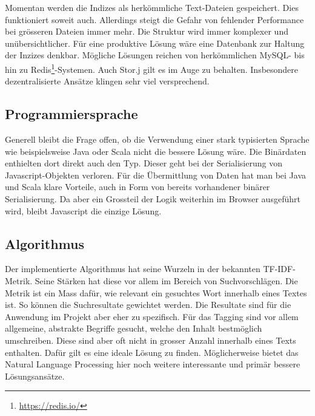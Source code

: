Momentan werden die Indizes als herkömmliche Text-Dateien gespeichert. Dies funktioniert soweit auch. Allerdings steigt die Gefahr von fehlender Performance bei grösseren Dateien immer mehr. Die Struktur wird immer komplexer und unübersichtlicher. Für eine produktive Lösung wäre eine Datenbank zur Haltung der Inzizes denkbar. Mögliche Lösungen reichen von herkömmlichen MySQL- bis hin zu Redis\footnote{\url{https://redis.io/}}-Systemen. Auch Stor.j gilt es im Auge zu behalten. Insbesondere dezentralisierte Ansätze klingen sehr viel versprechend.

\subsection{Programmiersprache}

Generell bleibt die Frage offen, ob die Verwendung einer stark typisierten Sprache wie beispielsweise Java oder Scala nicht die bessere Lösung wäre. Die Binärdaten enthielten dort direkt auch den Typ. Dieser geht bei der Serialisierung von Javascript-Objekten verloren. Für die Übermittlung von Daten hat man bei Java und Scala klare Vorteile, auch in Form von bereits vorhandener binärer Serialisierung. Da aber ein Grossteil der Logik weiterhin im Browser ausgeführt wird, bleibt Javascript die einzige Lösung.

\subsection{Algorithmus}

Der implementierte Algorithmus hat seine Wurzeln in der bekannten TF-IDF-Metrik. Seine Stärken hat diese vor allem im Bereich von Suchvorschlägen. Die Metrik ist ein Mass dafür, wie relevant ein gesuchtes Wort innerhalb eines Textes ist. So können die Suchresultate gewichtet werden. Die Resultate sind für die Anwendung im Projekt aber eher zu spezifisch. Für das Tagging sind vor allem allgemeine, abstrakte Begriffe gesucht, welche den Inhalt bestmöglich umschreiben. Diese sind aber oft nicht in grosser Anzahl innerhalb eines Texts enthalten. Dafür gilt es eine ideale Lösung zu finden. Möglicherweise bietet das Natural Language Processing hier noch weitere interessante und primär bessere Lösungsansätze.

